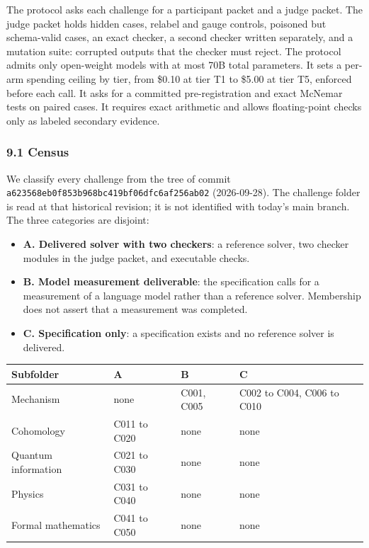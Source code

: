 \documentclass[
  11pt,
]{article}
\providecommand{\tightlist}{%
  \setlength{\itemsep}{0pt}\setlength{\parskip}{0pt}}
\begin{document}
The protocol asks each challenge for a participant packet and a judge
packet. The judge packet holds hidden cases, relabel and gauge controls,
poisoned but schema-valid cases, an exact checker, a second checker
written separately, and a mutation suite: corrupted outputs that the
checker must reject. The protocol admits only open-weight models with at
most 70B total parameters. It sets a per-arm spending ceiling by tier,
from \$0.10 at tier T1 to \$5.00 at tier T5, enforced before each call.
It asks for a committed pre-registration and exact McNemar tests on
paired cases. It requires exact arithmetic and allows floating-point
checks only as labeled secondary evidence.

\hypertarget{census}{%
\subsubsection{9.1 Census}\label{census}}

We classify every challenge from the tree of commit
\nolinkurl{a623568eb0f853b968bc419bf06dfc6af256ab02} (2026-09-28). The
challenge folder is read at that historical revision; it is not
identified with today's main branch. The three categories are disjoint:

\begin{itemize}
\tightlist
\item
  \textbf{A. Delivered solver with two checkers}: a reference solver,
  two checker modules in the judge packet, and executable checks.
\item
  \textbf{B. Model measurement deliverable}: the specification calls for
  a measurement of a language model rather than a reference solver.
  Membership does not assert that a measurement was completed.
\item
  \textbf{C. Specification only}: a specification exists and no
  reference solver is delivered.
\end{itemize}

\begin{longtable}[]{@{}llll@{}}
\toprule\noalign{}
Subfolder & A & B & C \\
\midrule\noalign{}
\endhead
\bottomrule\noalign{}
\endlastfoot
Mechanism & none & C001, C005 & C002 to C004, C006 to C010 \\
Cohomology & C011 to C020 & none & none \\
Quantum information & C021 to C030 & none & none \\
Physics & C031 to C040 & none & none \\
Formal mathematics & C041 to C050 & none & none \\
\end{longtable}
\end{document}
